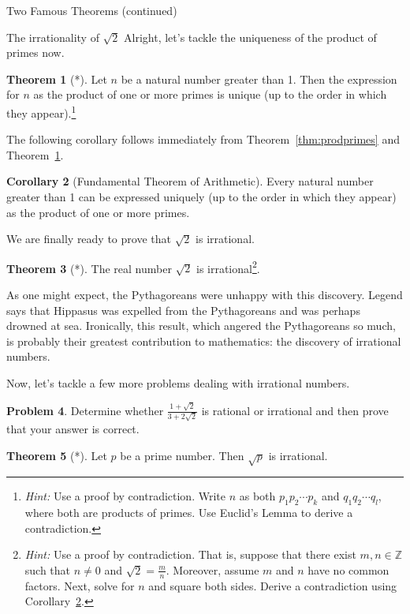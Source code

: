 \documentclass[11pt]{article}
\theoremstyle{definition}
\newtheorem{theorem}{Theorem}[section]
\newtheorem{corollary}[theorem]{Corollary}
\newtheorem{problem}[theorem]{Problem}
\begin{document}
\begin{section}{Two Famous Theorems (continued)}
\begin{subsection}{The irrationality of $\sqrt{2}$}
Alright, let's tackle the uniqueness of the product of primes now.

\begin{theorem}[*]\label{thm:unique}
Let $n$ be a natural number greater than 1.  Then the expression for $n$ as the product of one or more primes is unique (up to the order in which they appear).\footnote{\emph{Hint:} Use a proof by contradiction.  Write $n$ as both $p_1 p_2 \cdots p_k$ and $q_1 q_2 \cdots q_l$, where both are products of primes.  Use Euclid's Lemma to derive a contradiction.}
\end{theorem}

The following corollary follows immediately from Theorem~\ref{thm:prodprimes} and Theorem~\ref{thm:unique}.

\begin{corollary}[Fundamental Theorem of Arithmetic]\label{cor:FTA}
Every natural number greater than 1 can be expressed uniquely (up to the order in which they appear) as the product of one or more primes.
\end{corollary}

We are finally ready to prove that $\sqrt{2}$ is irrational.

\begin{theorem}[*]
\label{thm:sqrt2}
The real number $\sqrt{2}$ is irrational\footnote{\emph{Hint:} Use a proof by contradiction.  That is, suppose that there exist $m,n\in\mathbb{Z}$ such that $n\ne 0$ and $\sqrt{2}=\frac{m}{n}$. Moreover, assume $m$ and $n$ have no common factors.  Next, solve for $n$ and square both sides.  Derive a contradiction using Corollary~\ref{cor:FTA}.}.
\end{theorem}

As one might expect, the Pythagoreans were unhappy with this discovery. Legend says that Hippasus was expelled from the Pythagoreans and was perhaps drowned at sea. Ironically, this result, which angered the Pythagoreans so much, is probably their greatest contribution to mathematics: the discovery of irrational numbers.

Now, let's tackle a few more problems dealing with irrational numbers.

\begin{problem}
Determine whether $\displaystyle \frac{1+\sqrt{2}}{3+2\sqrt{2}}$ is rational or irrational and then prove that your answer is correct.
\end{problem}

\begin{theorem}[*]\label{thm:sqrtp}
Let $p$ be a prime number.  Then $\sqrt{p}$ is irrational.
\end{theorem}


\end{subsection}
\end{section}
\end{document}
